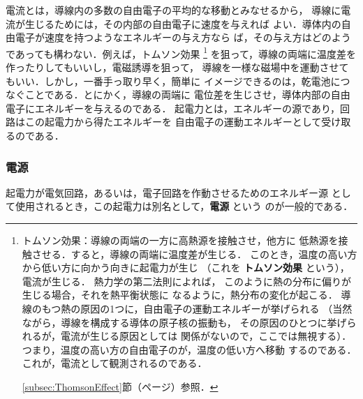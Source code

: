         電流とは，導線内の多数の自由電子の平均的な移動とみなせるから，
        導線に電流が生じるためには，その内部の自由電子に速度を与えれば
        よい．導体内の自由電子が速度を持つようなエネルギーの与え方なら
        ば，その与え方はどのようであっても構わない．例えば，トムソン効果
            \footnote{
                トムソン効果：導線の両端の一方に高熱源を接触させ，他方に
                低熱源を接触させる．すると，導線の両端に温度差が生じる．
                このとき，温度の高い方から低い方に向かう向きに起電力が生じ
                （これを \textbf{トムソン効果} という），電流が生じる．
                熱力学の第二法則によれば，
                このように熱の分布に偏りが生じる場合，それを熱平衡状態に
                なるように，熱分布の変化が起こる．
                導線のもつ熱の原因の1つに，自由電子の運動エネルギーが挙げられる
                （当然ながら，導線を構成する導体の原子核の振動も，
                その原因のひとつに挙げられるが，電流が生じる原因としては
                関係がないので，ここでは無視する）．
                つまり，温度の高い方の自由電子のが，温度の低い方へ移動
                するのである．これが，電流として観測されるのである．

                \ref{subsec:ThomsonEffect}節（\pageref{subsec:ThomsonEffect}ページ）参照．
            }
        を狙って，導線の両端に温度差を作ったりしてもいいし，電磁誘導を狙って，
        導線を一様な磁場中を運動させてもいい．しかし，一番手っ取り早く，簡単に
        イメージできるのは，乾電池につなぐことである．とにかく，導線の両端に
        電位差を生じさせ，導体内部の自由電子にエネルギーを与えるのである．
        起電力とは，エネルギーの源であり，回路はこの起電力から得たエネルギーを
        自由電子の運動エネルギーとして受け取るのである．

    \subsubsection{電源}
        起電力が電気回路，あるいは，電子回路を作動させるためのエネルギー源
        として使用されるとき，この起電力は別名として，\textbf{電源} という
        のが一般的である．

